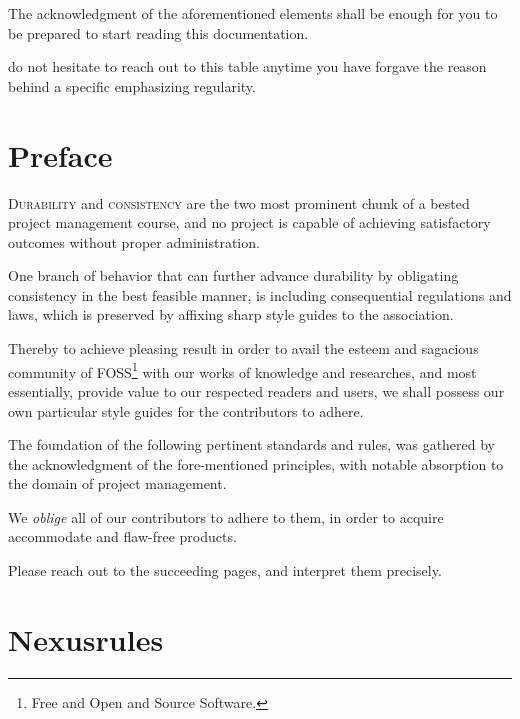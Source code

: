 \documentclass[13pt]{scrarticle}
\newcommand{\header}[1]{\hspace{5.3cm} \textsf{#1} \relax{}}
\newcommand{\important}[1]{\textit{#1}}
\newcommand{\name}[1]{\color{red} {\textsc{#1}}\color{black}}
\begin{document}
    The acknowledgment of the aforementioned elements shall be enough
    for you to be prepared to start reading this documentation. \newline

    do not hesitate to reach out to this table anytime you have forgave the reason behind a specific emphasizing regularity. \newline


    \newpage
    \section{\header{Preface}}


    \name{Durability } and \name{consistency } are the two most prominent chunk of a bested project management course,
    and no project is capable of achieving satisfactory outcomes without proper administration. \newline

    One branch of behavior that can further advance durability by obligating consistency in the best feasible manner,
    is including consequential regulations and laws,
    which is preserved by affixing sharp style guides to the association. \newline

    Thereby to achieve pleasing result in order to avail the esteem and sagacious community of \name{FOSS}\footnote{Free and Open and Source Software.} with our works of knowledge and researches,
    and most essentially, provide value to our respected readers and users,
    we shall possess our own particular style guides for the contributors to adhere. \newline

    The foundation of the following pertinent standards and rules, was gathered by the acknowledgment of the fore-mentioned
    principles, with notable absorption to the domain of project management. \newline

    We \important{oblige} all of our contributors to adhere to them,
    in order to acquire accommodate and flaw-free products. \newline

    Please reach out to the succeeding pages,
    and interpret them precisely.

    \newpage
    \thispagestyle{fancy}

    \section{\header{Nexusrules}}
\end{document}
